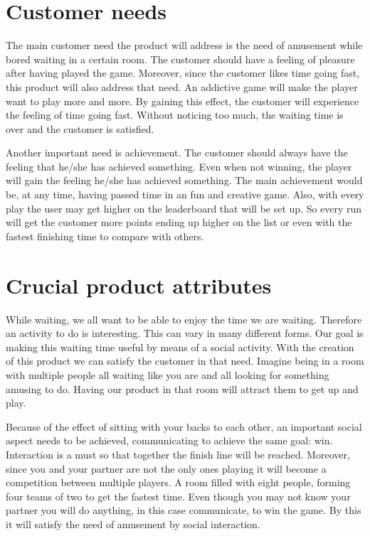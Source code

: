 \documentclass[11pt,twoside,a4paper]{article}
\begin{document}
\section{Customer needs}
The main customer need the product will address is the need of amusement while bored waiting in a certain room. The customer should have a feeling of pleasure after having played the game. Moreover, since the customer likes time going fast, this product will also address that need. An addictive game will make the player want to play more and more. By gaining this effect, the customer will experience the feeling of time going fast. Without noticing too much, the waiting time is over and the customer is satisfied.

Another important need is achievement. The customer should always have the feeling that he/she has achieved something. Even when not winning, the player will gain the feeling he/she has achieved something. The main achievement would be, at any time, having passed time in an fun and creative game. Also, with every play the user may get higher on the leaderboard that will be set up. So every run will get the customer more points ending up higher on the list or even with the fastest finishing time to compare with others.


\section{Crucial product attributes}
While waiting, we all want to be able to enjoy the time we are waiting. Therefore an activity to do is interesting. This can vary in many different forms. Our goal is making this waiting time useful by means of a social activity. With the creation of this product we can satisfy the customer in that need. Imagine being in a room with multiple people all waiting like you are and all looking for something amusing to do. Having our product in that room will attract them to get up and play.

Because of the effect of sitting with your backs to each other, an important social aspect needs to be achieved, communicating to achieve the same goal: win. Interaction is a must so that together the finish line will be reached. Moreover, since you and your partner are not the only ones playing it will become a competition between multiple players. A room filled with eight people, forming four teams of two to get the fastest time. Even though you may not know your partner you will do anything, in this case communicate, to win the game.  By this it will satisfy the need of amusement by social interaction.
\end{document}
